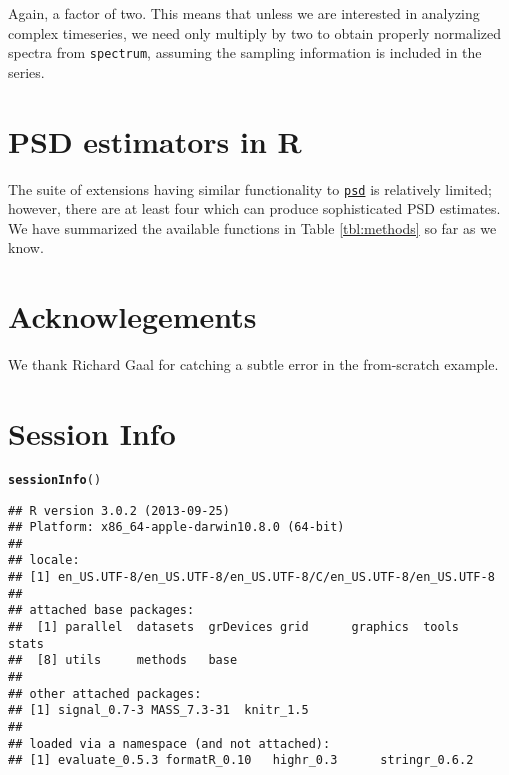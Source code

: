 \documentclass[10pt]{article}\usepackage[]{graphicx}\usepackage[]{color}
\makeatletter
\newcommand{\hlstd}[1]{\textcolor[rgb]{0.345,0.345,0.345}{#1}}%
\newcommand{\hlkwd}[1]{\textcolor[rgb]{0.737,0.353,0.396}{\textbf{#1}}}%
\newenvironment{kframe}{%
 \def\at@end@of@kframe{}%
 \ifinner\ifhmode%
  \def\at@end@of@kframe{\end{minipage}}%
  \begin{minipage}{\columnwidth}%
 \fi\fi%
 \def\FrameCommand##1{\hskip\@totalleftmargin \hskip-\fboxsep
 \colorbox{shadecolor}{##1}\hskip-\fboxsep
     \hskip-\linewidth \hskip-\@totalleftmargin \hskip\columnwidth}%
 \MakeFramed {\advance\hsize-\width
   \@totalleftmargin\z@ \linewidth\hsize
   \@setminipage}}%
 {\par\unskip\endMakeFramed%
 \at@end@of@kframe}
\newenvironment{knitrout}{}{} %
\newcommand{\Rcmd}[1]{\texttt{#1}}
\newcommand{\psd}[0]{\href{http://abarbour.github.com/psd/}{\color{blue}\Rcmd{psd}}}
\makeatother
\begin{document}
Again, a factor of two. 
This means that unless we are interested in analyzing complex
timeseries, we need only multiply by two 
to obtain properly normalized spectra
from \Rcmd{spectrum}, 
assuming the sampling information is included in the series.

\section{PSD estimators in R}
The suite of extensions having
similar functionality to \psd{}
is relatively limited; however, there are at least four which
can produce sophisticated PSD estimates.   We have
summarized the available functions in Table \ref{tbl:methods}
so far as we know.



\section{Acknowlegements}
We thank Richard Gaal for catching a subtle error in the from-scratch example.

\section*{Session Info}
\begin{knitrout}
\color{fgcolor}\begin{kframe}
\begin{alltt}
\hlkwd{sessionInfo}\hlstd{()}
\end{alltt}
\begin{verbatim}
## R version 3.0.2 (2013-09-25)
## Platform: x86_64-apple-darwin10.8.0 (64-bit)
## 
## locale:
## [1] en_US.UTF-8/en_US.UTF-8/en_US.UTF-8/C/en_US.UTF-8/en_US.UTF-8
## 
## attached base packages:
##  [1] parallel  datasets  grDevices grid      graphics  tools     stats    
##  [8] utils     methods   base     
## 
## other attached packages:
## [1] signal_0.7-3 MASS_7.3-31  knitr_1.5   
## 
## loaded via a namespace (and not attached):
## [1] evaluate_0.5.3 formatR_0.10   highr_0.3      stringr_0.6.2
\end{verbatim}
\end{kframe}
\end{knitrout}






\printindex
\end{document}
